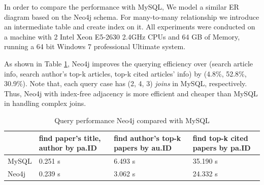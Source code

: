 

 In order to compare the performance with MySQL, We model a similar ER diagram based on the Neo4j schema. For many-to-many relationship we introduce an intermediate table and create index on it. All experiments were conducted on a machine with 2 Intel Xeon E5-2630 2.4GHz CPUs and 64 GB of Memory, running a 64 bit Windows 7 professional Ultimate system.
\par
As shown in Table \ref{tab-compare}, Neo4j improves the querying efficiency over (search article info, search author's top-k articles, top-k cited articles' info) by (4.8\%, 52.8\%, 30.9\%). Note that, each query case has (2, 4, 3) {\em joins} in MySQL, respectively. Thus, Neo4j with index-free adjacency is more efficient and cheaper than MySQL in handling complex joins.






\begin{table}[t!]
\begin{center}
\caption{Query performance Neo4j compared with MySQL}
\label{tab-compare}
\begin{scriptsize}
\begin{tabular}{lp{2cm}p{2cm}p{2cm}}
\hline
{} & {find paper's title, author by pa.ID} & {find author's top-k papers by au.ID} & {find top-k cited papers by pa.ID}\\
\hline
MySQL & 0.251 s  & 6.493 s & 35.190 s \\
Neo4j & 0.239 s  & 3.062 s & 24.332 s \\
\hline
\end{tabular} \\ %
\end{scriptsize}
\end{center}
\end{table}

